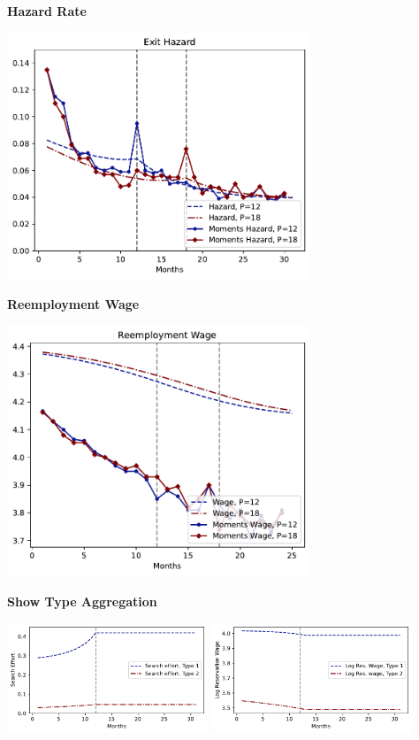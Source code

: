 \documentclass[letter, 10pt]{article}
\begin{document}
\textbf{Hazard Rate} 
 

\includegraphics[clip=true,trim=0cm 0cm 0cm 0cm,width = 0.68\textwidth]{figures_Est1_compiled/fig_haz.pdf} 

\textbf{Reemployment Wage} 
 

\includegraphics[clip=true,trim=0cm 0cm 0cm 0cm,width = 0.68\textwidth]{figures_Est1_compiled/fig_wage.pdf} 

\pagebreak 
 \textbf{Show Type Aggregation} 
 
\includegraphics[clip=true,trim=0cm 0cm 0cm 0cm,width = 0.45\textwidth]{figures_Est1_compiled/fig_type_agg_s.pdf} 
\includegraphics[clip=true,trim=0cm 0cm 0cm 0cm,width = 0.45\textwidth]{figures_Est1_compiled/fig_type_agg_phi.pdf} 
\end{document}
